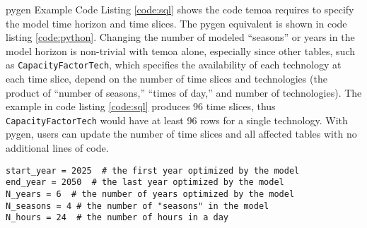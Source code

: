 \gls{pygen} Example
Code Listing \ref{code:sql} shows
the code \gls{temoa} requires to specify the model time horizon and time slices.
The \gls{pygen} equivalent is shown in code listing \ref{code:python}. Changing
the number of modeled ``seasons'' or years in the model horizon is non-trivial with
\gls{temoa} alone, especially since other tables, such as \texttt{CapacityFactorTech},
which specifies the availability of each technology at each time slice, depend
on the number of time slices and technologies (the product of ``number of seasons,''
``times of day,'' and number of technologies).
The example in code listing \ref{code:sql} produces 96 time slices, thus \texttt{CapacityFactorTech}
would have at least 96 rows for a single technology. With \gls{pygen}, users can
update the number of time slices and all affected tables with no additional lines
of code.




\begin{lstlisting}[style=pythonstyle, caption={Equivalent \gls{pygen} code to specify the model horizon and time slices.}, label={code:python}, floatplacement=H]
start_year = 2025  # the first year optimized by the model
end_year = 2050  # the last year optimized by the model
N_years = 6  # the number of years optimized by the model
N_seasons = 4 # the number of "seasons" in the model
N_hours = 24  # the number of hours in a day
\end{lstlisting}

